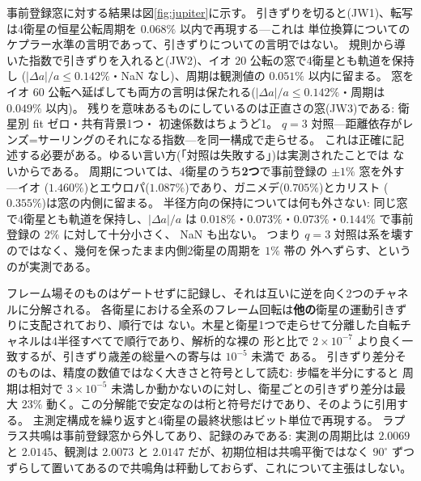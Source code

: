 \documentclass[a4paper,10pt,twocolumn]{ltjsarticle}
\begin{document}
事前登録窓に対する結果は図\ref{fig:jupiter}に示す。
引きずりを切ると(JW1)、転写は4衛星の恒星公転周期を $0.068\%$ 以内で再現する---これは
単位換算についてのケプラー水準の言明であって、引きずりについての言明ではない。
規則から導いた指数で引きずりを入れると(JW2)、イオ $20$ 公転の窓で4衛星とも軌道を保持し
($|\Delta a|/a\leq0.142\%$・NaN なし)、周期は観測値の $0.051\%$ 以内に留まる。
窓をイオ $60$ 公転へ延ばしても両方の言明は保たれる($|\Delta a|/a\leq0.142\%$・周期は
$0.049\%$ 以内)。
残りを意味あるものにしているのは正直さの窓(JW3)である: 衛星別 fit ゼロ・共有背景1つ・
初速係数はちょうど1。
$q=3$ 対照---距離依存がレンズ=サーリングのそれになる指数---を同一構成で走らせる。
これは正確に記述する必要がある。ゆるい言い方(「対照は失敗する」)は実測されたことでは
ないからである。
周期については、4衛星のうち\textbf{2つ}で事前登録の $\pm1\%$ 窓を外す---イオ
($1.460\%$)とエウロパ($1.087\%$)であり、ガニメデ($0.705\%$)とカリスト
($0.355\%$)は窓の内側に留まる。
半径方向の保持については何も外さない: 同じ窓で4衛星とも軌道を保持し、$|\Delta a|/a$ は
$0.018\%$・$0.073\%$・$0.073\%$・$0.144\%$ で事前登録の $2\%$ に対して十分小さく、
NaN も出ない。
つまり $q=3$ 対照は系を壊すのではなく、幾何を保ったまま内側2衛星の周期を $1\%$ 帯の
外へずらす、というのが実測である。

フレーム場そのものはゲートせずに記録し、それは互いに逆を向く2つのチャネルに分解される。
各衛星における全系のフレーム回転は\textbf{他の}衛星の運動引きずりに支配されており、順行では
ない。木星と衛星1つで走らせて分離した自転チャネルは4半径すべてで順行であり、解析的な裸の
形と比で $2\times10^{-7}$ より良く一致するが、引きずり歳差の総量への寄与は $10^{-5}$ 未満で
ある。
引きずり差分そのものは、精度の数値ではなく大きさと符号として読む: 步幅を半分にすると
周期は相対で $3\times10^{-5}$ 未満しか動かないのに対し、衛星ごとの引きずり差分は最大
$23\%$ 動く。この分解能で安定なのは桁と符号だけであり、そのように引用する。
主測定構成を繰り返すと4衛星の最終状態はビット単位で再現する。
ラプラス共鳴は事前登録窓から外してあり、記録のみである: 実測の周期比は $2.0069$ と
$2.0145$、観測は $2.0073$ と $2.0147$ だが、初期位相は共鳴平衡ではなく $90^{\circ}$ ずつ
ずらして置いてあるので共鳴角は秤動しておらず、これについて主張はしない。

\end{document}
